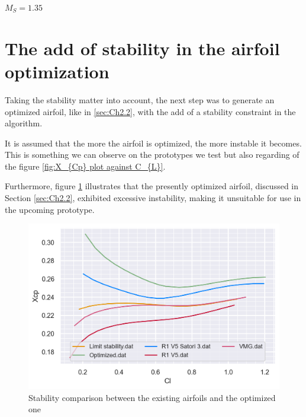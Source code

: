 \underline{$M_{S} = 1.35$}


\section{The add of stability in the airfoil optimization}
\label{sec:Ch3.3}

Taking the stability matter into account, the next step was to generate an optimized airfoil, like in \ref{sec:Ch2.2}, with the add of a stability constraint in the algorithm. 

It is assumed that the more the airfoil is optimized, the more instable it becomes. This is something we can observe on the prototypes we test but also regarding of the figure \ref{fig:X_{Cp} plot against C_{L}}. 

Furthermore, figure \ref{fig:Stability comparison between the existing airfoils and the optimized one} illustrates that the presently optimized airfoil, discussed in Section \ref{sec:Ch2.2}, exhibited excessive instability, making it unsuitable for use in the upcoming prototype.

\begin{figure}[H]
    \centering
    \includegraphics[width=1.0\textwidth]{figures/Stability/optimized airfoil stability.png}
    \caption{Stability comparison between the existing airfoils and the optimized one}
    \label{fig:Stability comparison between the existing airfoils and the optimized one}
\end{figure}

